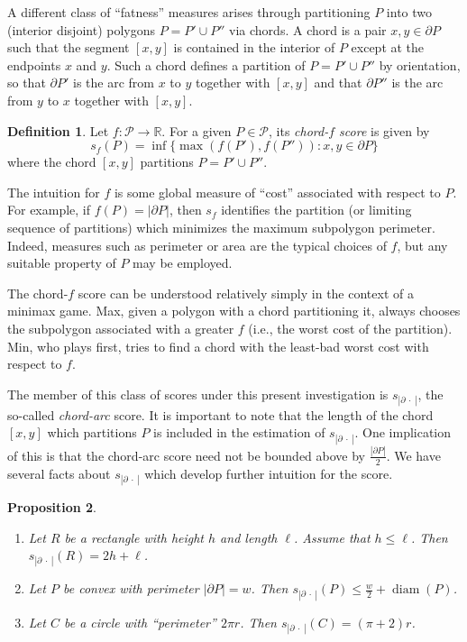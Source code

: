 \documentclass[]{jocg}
\newcommand{\RR}{\mathbb{R}}
\newcommand{\set}[1]{\{#1\}}
\newcommand{\abs}[1]{|#1|}
\newcommand{\chordarc}{{s_{\abs{\partial~\cdot~}}}}
\DeclareMathOperator{\diam}{\mathrm{diam}}
\newtheorem{proposition}{Proposition}[section]
\theoremstyle{definition}
\newtheorem{definition}[proposition]{Definition}
\theoremstyle{remark}
\begin{document}
A different class of ``fatness'' measures arises through partitioning $P$ into
two (interior disjoint) polygons $P = P' \cup P''$ via chords. A chord is a pair
$x,y \in \partial P$ such that the segment $[x,y]$ is contained in the interior
of $P$ except at the endpoints $x$ and $y$. Such a chord defines a partition of
$P = P' \cup P''$ by orientation, so that $\partial P'$ is the arc from $x$ to
$y$ together with $[x,y]$ and that $\partial P''$ is the arc from $y$ to $x$
together with $[x,y]$.

\begin{definition}
  Let $f : \mathcal{P} \to \RR$. For a given $P \in \mathcal{P}$, its
  \emph{chord-$f$ score} is given by
  \begin{equation*}
    s_f (P) = \inf \set{\max(f(P'), f(P'')) : x, y \in \partial P}
  \end{equation*}
  where the chord $[x,y]$ partitions $P = P' \cup P''$.
  \label{def:chord-f}
\end{definition}

The intuition for $f$ is some global measure of ``cost'' associated with respect
to $P$. For example, if $f(P) = \abs{\partial P}$, then $s_f$ identifies the
partition (or limiting sequence of partitions) which minimizes the maximum
subpolygon perimeter. Indeed, measures such as perimeter or area are the typical
choices of $f$, but any suitable property of $P$  may be employed. 

The chord-$f$ score can be understood relatively simply in the context of a
minimax game. Max, given a polygon with a chord partitioning it, always chooses
the subpolygon associated with a greater $f$ (i.e., the worst cost of the
partition). Min, who plays first, tries to find a chord with the least-bad worst
cost with respect to $f$.

The member of this class of scores under this present investigation is
$\chordarc$, the so-called \emph{chord-arc} score. It is important to note that
the length of the chord $[x,y]$ which partitions $P$ is included in the
estimation of $\chordarc$. One implication of this is that the chord-arc score
need not be bounded above by $\frac{\abs{\partial P}}{2}$.  We have several
facts about $\chordarc$ which develop further intuition for the score.
\begin{proposition}
  \begin{enumerate}
    \item Let $R$ be a rectangle with height $h$ and length $\ell$. Assume that
      $h \leq \ell$. Then $\chordarc(R) = 2h + \ell$.
    \item Let $P$ be convex with perimeter $\abs{\partial P} = w$. Then
      $\chordarc(P) \leq \frac{w}{2} + \diam (P)$.
    \item Let $C$ be a circle with ``perimeter'' $2\pi r$. Then $\chordarc(C) =
      (\pi + 2)r$.
  \end{enumerate}
  \label{rem:chordarc}
\end{proposition}
\end{document}
